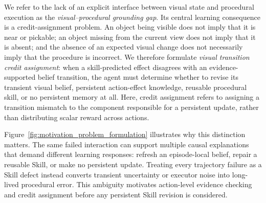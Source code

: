 We refer to the lack of an explicit interface between visual state and procedural execution as the \emph{visual--procedural grounding gap}. Its central learning consequence is a credit-assignment problem. An object being visible does not imply that it is near or pickable; an object missing from the current view does not imply that it is absent; and the absence of an expected visual change does not necessarily imply that the procedure is incorrect. We therefore formulate \emph{visual transition credit assignment}: when a skill-predicted effect disagrees with an evidence-supported belief transition, the agent must determine whether to revise its transient visual belief, persistent action-effect knowledge, reusable procedural skill, or no persistent memory at all. Here, credit assignment refers to assigning a transition mismatch to the component responsible for a persistent update, rather than distributing scalar reward across actions.

Figure~\ref{fig:motivation_problem_formulation} illustrates why this distinction matters. The same failed interaction can support multiple causal explanations that demand different learning responses: refresh an episode-local belief, repair a reusable Skill, or make no persistent update. Treating every trajectory failure as a Skill defect instead converts transient uncertainty or executor noise into long-lived procedural error. This ambiguity motivates action-level evidence checking and credit assignment before any persistent Skill revision is considered.


